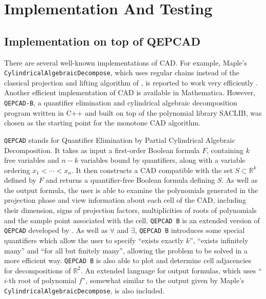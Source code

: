 \documentclass[
]{book}
\theoremstyle{definition}
\theoremstyle{definition}
\theoremstyle{definition}
\theoremstyle{definition}
\theoremstyle{remark}
\begin{document}
\hypertarget{sec:implementation-and-testing}{%
\chapter{Implementation And Testing}\label{sec:implementation-and-testing}}

\hypertarget{implementation-on-top-of-qepcad}{%
\section{Implementation on top of QEPCAD}\label{implementation-on-top-of-qepcad}}

There are several well-known implementations of CAD. For example, Maple's \texttt{CylindricalAlgebraicDecompose}, which uses regular chains instead of the classical projection and lifting algorithm of \citet{collins1975}, is reported to work very efficiently \citep{chen2014}. Another efficient implementation of CAD is available in Mathematica. However, \texttt{QEPCAD-B}, a quantifier elimination and cylindrical algebraic decomposition program written in C++ and built on top of the polynomial library SACLIB, was chosen as the starting point for the monotone CAD algorithm.

\texttt{QEPCAD} stands for Quantifier Elimination by Partial Cylindrical Algebraic Decomposition. It takes as input a first-order Boolean formula \(F\), containing \(k\) free variables and \(n-k\) variables bound by quantifiers, along with a variable ordering \(x_1 < \cdots < x_n\). It then constructs a CAD compatible with the set \(S \subset \mathbb{R}^k\) defined by \(F\) and returns a quantifier-free Boolean formula defining \(S\). As well as the output formula, the user is able to examine the polynomials generated in the projection phase and view information about each cell of the CAD, including their dimension, signs of projection factors, multiplicities of roots of polynomials and the sample point associated with the cell. \texttt{QEPCAD\ B} is an extended version of \texttt{QEPCAD} developed by \citet{brownQepcad}.
As well as \(\forall\) and \(\exists\), \texttt{QEPCAD\ B} introduces some special quantifiers which allow the user to specify ``exists exactly \(k\)'', ``exists infinitely many'' and ``for all but finitely many'', allowing the problem to be solved in a more efficient way. \texttt{QEPCAD\ B} is also able to plot and determine cell adjacencies for decompositions of \(\mathbb{R}^2\). An extended language for output formulas, which uses ``\(i\)-th root of polynomial \(f\)'', somewhat similar to the output given by Maple's \texttt{CylindricalAlgebraicDecompose}, is also included.
\end{document}
